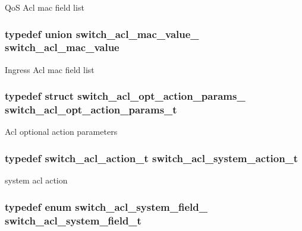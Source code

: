 Qo\+S Acl mac field list \hypertarget{group__ACL_gaebafd1394ccbcc5e09ad753cd6823e1d}{
\subsubsection[{switch\+\_\+acl\+\_\+mac\+\_\+value}]{\setlength{\rightskip}{0pt plus 5cm}typedef union {\bf switch\+\_\+acl\+\_\+mac\+\_\+value\+\_\+}  {\bf switch\+\_\+acl\+\_\+mac\+\_\+value}}}\label{group__ACL_gaebafd1394ccbcc5e09ad753cd6823e1d}
Ingress Acl mac field list \hypertarget{group__ACL_gaf6629027c512d3f6976b8cd8eba8c4fb}{
\subsubsection[{switch\+\_\+acl\+\_\+opt\+\_\+action\+\_\+params\+\_\+t}]{\setlength{\rightskip}{0pt plus 5cm}typedef struct {\bf switch\+\_\+acl\+\_\+opt\+\_\+action\+\_\+params\+\_\+}  {\bf switch\+\_\+acl\+\_\+opt\+\_\+action\+\_\+params\+\_\+t}}}\label{group__ACL_gaf6629027c512d3f6976b8cd8eba8c4fb}
Acl optional action parameters \hypertarget{group__ACL_gaaa0b586aa6dbbc36517c01ee12d8d0a7}{
\subsubsection[{switch\+\_\+acl\+\_\+system\+\_\+action\+\_\+t}]{\setlength{\rightskip}{0pt plus 5cm}typedef {\bf switch\+\_\+acl\+\_\+action\+\_\+t} {\bf switch\+\_\+acl\+\_\+system\+\_\+action\+\_\+t}}}\label{group__ACL_gaaa0b586aa6dbbc36517c01ee12d8d0a7}
system acl action \hypertarget{group__ACL_gab50eaa35e57e14e7b50bbcb2c43c4012}{
\subsubsection[{switch\+\_\+acl\+\_\+system\+\_\+field\+\_\+t}]{\setlength{\rightskip}{0pt plus 5cm}typedef enum {\bf switch\+\_\+acl\+\_\+system\+\_\+field\+\_\+}  {\bf switch\+\_\+acl\+\_\+system\+\_\+field\+\_\+t}}}\label{group__ACL_gab50eaa35e57e14e7b50bbcb2c43c4012}
